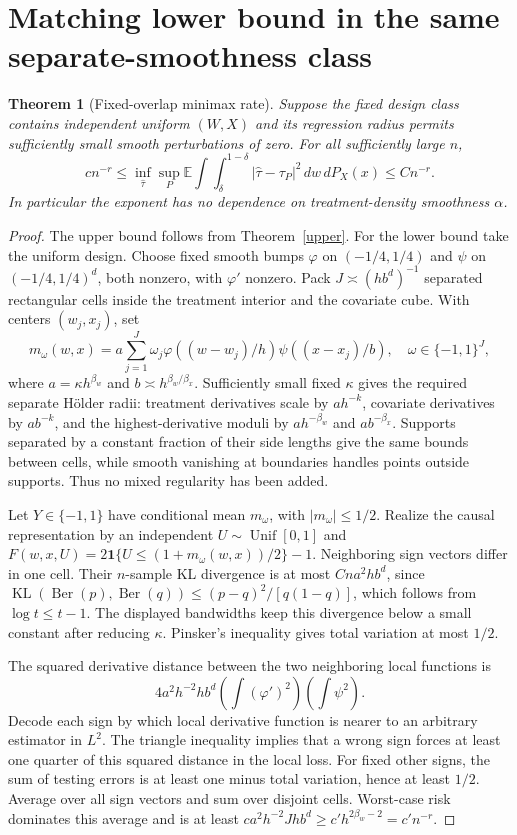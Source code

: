 \documentclass[11pt]{article}
\newtheorem{theorem}{Theorem}
\theoremstyle{remark}\newtheorem{remark}[theorem]{Remark}
\newcommand{\E}{\mathbb E}
\newcommand{\Ind}{\mathbf 1}
\newcommand{\KL}{\operatorname{KL}}
\begin{document}
\section{Matching lower bound in the same separate-smoothness class}
\begin{theorem}[Fixed-overlap minimax rate]\label{minimax}
Suppose the fixed design class contains independent uniform $(W,X)$ and its regression radius permits sufficiently small smooth perturbations of zero. For all sufficiently large $n$,
\[
 c n^{-r}\leq
 \inf_{\widehat\tau}\sup_P\E\int\!\int_\delta^{1-\delta}
                 |\widehat\tau-\tau_P|^2\,dw\,dP_X(x)
 \leq Cn^{-r}.
\]
In particular the exponent has no dependence on treatment-density smoothness $\alpha$.
\end{theorem}
\begin{proof}
The upper bound follows from Theorem~\ref{upper}. For the lower bound take the uniform design. Choose fixed smooth bumps $\varphi$ on $(-1/4,1/4)$ and $\psi$ on $(-1/4,1/4)^d$, both nonzero, with $\varphi'$ nonzero. Pack $J\asymp (hb^d)^{-1}$ separated rectangular cells inside the treatment interior and the covariate cube. With centers $(w_j,x_j)$, set
\[
 m_\omega(w,x)=a\sum_{j=1}^J\omega_j
       \varphi((w-w_j)/h)\psi((x-x_j)/b),
       \quad \omega\in\{-1,1\}^J,
\]
where $a=\kappa h^{\beta_w}$ and $b\asymp h^{\beta_w/\beta_x}$. Sufficiently small fixed $\kappa$ gives the required separate H\"older radii: treatment derivatives scale by $ah^{-k}$, covariate derivatives by $ab^{-k}$, and the highest-derivative moduli by $ah^{-\beta_w}$ and $ab^{-\beta_x}$. Supports separated by a constant fraction of their side lengths give the same bounds between cells, while smooth vanishing at boundaries handles points outside supports. Thus no mixed regularity has been added.

Let $Y\in\{-1,1\}$ have conditional mean $m_\omega$, with $|m_\omega|\leq1/2$. Realize the causal representation by an independent $U\sim\operatorname{Unif}[0,1]$ and
$F(w,x,U)=2\Ind\{U\leq(1+m_\omega(w,x))/2\}-1$.
Neighboring sign vectors differ in one cell. Their $n$-sample KL divergence is at most $Cna^2hb^d$, since
$\KL(\operatorname{Ber}(p),\operatorname{Ber}(q))\leq(p-q)^2/[q(1-q)]$,
which follows from $\log t\leq t-1$. The displayed bandwidths keep this divergence below a small constant after reducing $\kappa$. Pinsker's inequality gives total variation at most $1/2$.

The squared derivative distance between the two neighboring local functions is
\[
 4a^2h^{-2}hb^d
              \left(\int(\varphi')^2\right)\left(\int\psi^2\right).
\]
Decode each sign by which local derivative function is nearer to an arbitrary estimator in $L^2$. The triangle inequality implies that a wrong sign forces at least one quarter of this squared distance in the local loss. For fixed other signs, the sum of testing errors is at least one minus total variation, hence at least $1/2$. Average over all sign vectors and sum over disjoint cells. Worst-case risk dominates this average and is at least
$ca^2h^{-2}Jhb^d\geq c'h^{2\beta_w-2}=c'n^{-r}$.
\end{proof}
\end{document}
